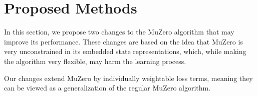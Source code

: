 \section{Proposed Methods}
In this section, we propose two changes to the MuZero algorithm that may improve its performance. These changes are based on the idea that MuZero is very unconstrained in its embedded state representations, which, while making the algorithm very flexible, may harm the learning process.

Our changes extend MuZero by individually weightable loss terms, meaning they can be viewed as a generalization of the regular MuZero algorithm.


